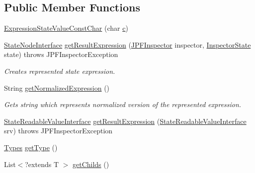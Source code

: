 \subsection*{Public Member Functions}
\begin{DoxyCompactItemize}
\item 
\hyperlink{classgov_1_1nasa_1_1jpf_1_1inspector_1_1server_1_1expression_1_1expressions_1_1_expression_state_value_const_char_ab20051cd7754b27223cdd32fe4f23a38}{Expression\+State\+Value\+Const\+Char} (char \hyperlink{classgov_1_1nasa_1_1jpf_1_1inspector_1_1server_1_1expression_1_1expressions_1_1_expression_state_value_const_char_afa89583a44a250193efe6cb6ecbff9a0}{c})
\item 
\hyperlink{interfacegov_1_1nasa_1_1jpf_1_1inspector_1_1server_1_1programstate_1_1_state_node_interface}{State\+Node\+Interface} \hyperlink{classgov_1_1nasa_1_1jpf_1_1inspector_1_1server_1_1expression_1_1expressions_1_1_expression_state_value_const_char_a43f65b5bc9fe8dbbec5f8135e9a797d6}{get\+Result\+Expression} (\hyperlink{classgov_1_1nasa_1_1jpf_1_1inspector_1_1server_1_1jpf_1_1_j_p_f_inspector}{J\+P\+F\+Inspector} inspector, \hyperlink{interfacegov_1_1nasa_1_1jpf_1_1inspector_1_1server_1_1expression_1_1_inspector_state}{Inspector\+State} state)  throws J\+P\+F\+Inspector\+Exception 
\begin{DoxyCompactList}\small\item\em Creates represented state expression. \end{DoxyCompactList}\item 
String \hyperlink{classgov_1_1nasa_1_1jpf_1_1inspector_1_1server_1_1expression_1_1expressions_1_1_expression_state_value_const_char_a8b8dbff87c3f81b9192355201350b701}{get\+Normalized\+Expression} ()
\begin{DoxyCompactList}\small\item\em Gets string which represents normalized version of the represented expression. \end{DoxyCompactList}\item 
\hyperlink{interfacegov_1_1nasa_1_1jpf_1_1inspector_1_1server_1_1programstate_1_1_state_readable_value_interface}{State\+Readable\+Value\+Interface} \hyperlink{classgov_1_1nasa_1_1jpf_1_1inspector_1_1server_1_1expression_1_1expressions_1_1_expression_state_value_const_a11bde76b1048dc08cc72bb596c357c7c}{get\+Result\+Expression} (\hyperlink{interfacegov_1_1nasa_1_1jpf_1_1inspector_1_1server_1_1programstate_1_1_state_readable_value_interface}{State\+Readable\+Value\+Interface} srv)  throws J\+P\+F\+Inspector\+Exception 
\item 
\hyperlink{enumgov_1_1nasa_1_1jpf_1_1inspector_1_1server_1_1expression_1_1_types}{Types} \hyperlink{classgov_1_1nasa_1_1jpf_1_1inspector_1_1server_1_1expression_1_1expressions_1_1_expression_state_value_a9317f49f60c166a2f46f90702e75f22e}{get\+Type} ()
\item 
List$<$?extends T $>$ \hyperlink{classgov_1_1nasa_1_1jpf_1_1inspector_1_1server_1_1expression_1_1_expression_state_unary_operator_ad010bcb9c4e2eb584321b5ceba8e1682}{get\+Childs} ()
\end{DoxyCompactItemize}
